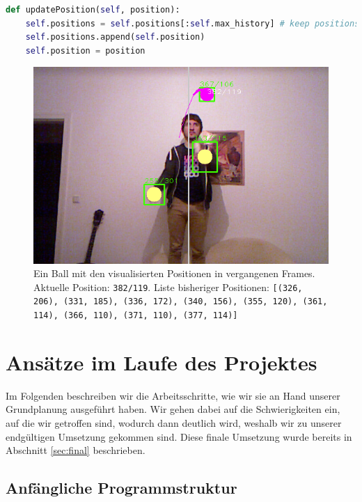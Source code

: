 \documentclass[12pt,a4paper,ngerman]{scrartcl}
\begin{document}
\begin{lstlisting}[language=Python,caption={\lstinline{Ball.py}, Ausschnitt}]
def updatePosition(self, position):
    self.positions = self.positions[:self.max_history] # keep positions list short
    self.positions.append(self.position)
    self.position = position
\end{lstlisting}


\begin{figure}[H]
    \centering
    \includegraphics[scale=0.6]{img/single-ball-position.png}
    \caption{Ein Ball mit den visualisierten Positionen in vergangenen Frames. Aktuelle Position: \lstinline{382/119}. Liste bisheriger Positionen: \lstinline{[(326, 206), (331, 185), (336, 172), (340, 156), (355, 120), (361, 114), (366, 110), (371, 110), (377, 114)]}}
\end{figure}

\section{Ansätze im Laufe des Projektes}
\label{sec:ansaetze}

Im Folgenden beschreiben wir die Arbeitsschritte, wie wir sie an Hand unserer
Grundplanung ausgeführt haben. Wir gehen dabei auf die Schwierigkeiten ein, auf die
wir getroffen sind, wodurch dann deutlich wird, weshalb wir zu unserer endgültigen
Umsetzung gekommen sind. Diese finale Umsetzung wurde bereits in Abschnitt \ref{sec:final} beschrieben.

\subsection{Anfängliche Programmstruktur}
\end{document}
